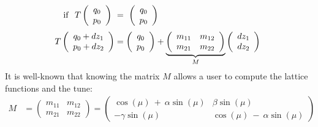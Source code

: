 \documentclass[english,12pt,article]{article} %
\begin{document}
%
\begin{align} {\rm i}{\rm f}~~T\left({\begin{array}{c} {q}_{0} \cr {p}_{0} \end{array}}\right)\ &=\ \left({\begin{array}{c} {q}_{0} \cr {p}_{0} \end{array}}\right)\nonumber \\
 T\left({\begin{array}{c} {q}_{0}+d{z}_{1} \cr {p}_{0}+d{z}_{2} \end{array}}\right)&=\left({\begin{array}{c} {q}_{0} \cr {p}_{0} \end{array}}\right) + \underbrace{\left({\begin{array}{cc}{m}_{11}&{m}_{12}\\
{m}_{21}&{m}_{22}\end{array}}\right)}\limits_{M}^{}\left({\begin{array}{c} d{z}_{1} \cr d{z}_{2} \end{array}}\right) \ \label{eqtpsa}\end{align}
%
It is well-known that knowing the matrix $M$ allows a user to compute the lattice functions and the tune:
%
\begin{align} M&=\left({\begin{array}{cc}{m}_{11}&{m}_{12}\\
{m}_{21}&{m}_{22}\end{array}}\right)=
\left({\begin{array}{cc}\cos\left({\mu }\right)\ +\ \alpha \sin\left({\mu }\right)&\beta \sin\left({\mu }\right)\\
-\gamma \sin\left({\mu }\right)&\cos\left({\mu }\right)\ -\ \alpha \sin\left({\mu }\right)\end{array}}\right)\label{eqcs}\end{align}
\end{document}
